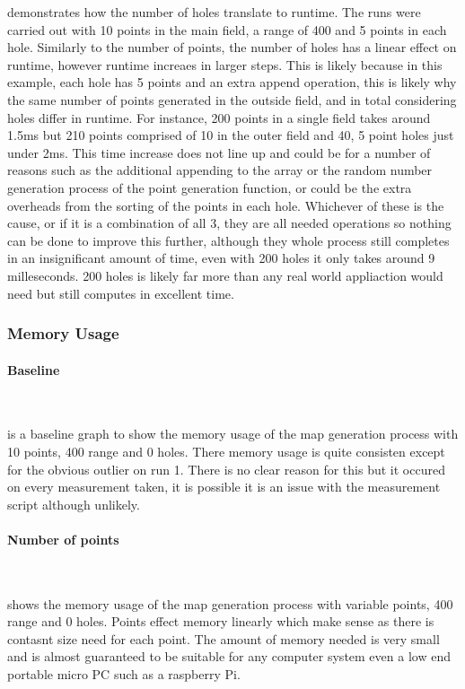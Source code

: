 \documentclass[final]{cmpreport_02}
\begin{document}
 demonstrates how the number of holes translate to runtime.
The runs were carried out with 10 points in the main field, a range of 400 and 5 points in each hole.
Similarly to the number of points, the number of holes has a linear effect on runtime, however runtime increaes in larger steps.
This is likely because in this example, each hole has 5 points and an extra append operation, this is likely why the same number of points generated in the outside field, and in total considering holes differ in runtime.
For instance, 200 points in a single field takes around 1.5ms but 210 points comprised of 10 in the outer field and 40, 5 point holes just under 2ms.
This time increase does not line up and could be for a number of reasons such as the additional appending to the array or the random number generation process of the point generation function, or could be the extra overheads from the sorting of the points in each hole.
Whichever of these is the cause, or if it is a combination of all 3, they are all needed operations so nothing can be done to improve this further, although they whole process still completes in an insignificant amount of time, even with 200 holes it only takes around 9 milleseconds.
200 holes is likely far more than any real world appliaction would need but still computes in excellent time.


\subsubsection{Memory Usage}

\paragraph{Baseline} \

 is a baseline graph to show the memory usage of the map generation process with 10 points, 400 range and 0 holes.
There memory usage is quite consisten except for the obvious outlier on run 1.
There is no clear reason for this but it occured on every measurement taken, it is possible it is an issue with the measurement script although unlikely.


\paragraph{Number of points} \

 shows the memory usage of the map generation process with variable points, 400 range and 0 holes.
Points effect memory linearly which make sense as there is contasnt size need for each point.
The amount of memory needed is very small and is almost guaranteed to be suitable for any computer system even a low end portable micro PC such as a raspberry Pi.
\end{document}

